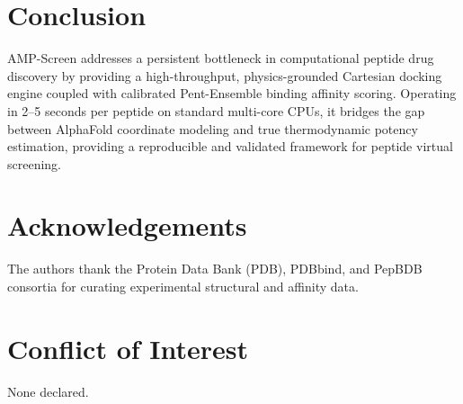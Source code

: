 \documentclass[10pt,twocolumn]{article}
\begin{document}
\section{Conclusion}
AMP-Screen addresses a persistent bottleneck in computational peptide drug discovery by providing a high-throughput, physics-grounded Cartesian docking engine coupled with calibrated Pent-Ensemble binding affinity scoring. Operating in 2--5 seconds per peptide on standard multi-core CPUs, it bridges the gap between AlphaFold coordinate modeling and true thermodynamic potency estimation, providing a reproducible and validated framework for peptide virtual screening.

\section*{Acknowledgements}
The authors thank the Protein Data Bank (PDB), PDBbind, and PepBDB consortia for curating experimental structural and affinity data.

\section*{Conflict of Interest}
None declared.
\end{document}
